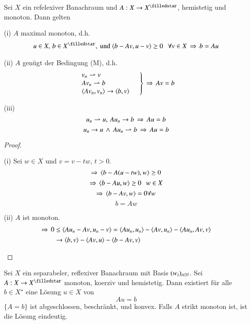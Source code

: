\begin{lem}[Minty]\label{4.5}
    Sei $X$ ein refelexiver Banachraum und $A:X\ra X^\star$, hemistetig und monoton. Dann gelten
    \begin{description}
        \item{(i)}
        $A$ maximal monoton, d.h.
        \begin{align*}
            u\in X, \, b\in X^\star, \text{ und } \lal b-Av,u-v\ral\geq 0 \qq \forall v\in X\, \Ra \,b=Au
        \end{align*}
        \item{(ii)}
        $A$ genügt der Bedingung (M), d.h.
        \begin{align}\label{15}
            \left.\begin{array}{lr}
            v_n \rightharpoonup v& \\
            Av_n\rightharpoonup b& \\
            \langle Av_n,v_n\rangle \rightarrow \langle b,v\rangle&
            \end{array}\right\}
            \,\Rightarrow \, Av=b            
        \end{align}
        \item{(iii)}
        \[
            u_n \rightharpoonup u, \, Au_n\rightarrow b \, \Rightarrow \, Au=b
        \]
        \[
            u_n\rightarrow u \,\wedge \, Au_n \rightharpoonup b \, \Rightarrow \, Au=b
        \]
    \end{description}
\end{lem}

\begin{proof}
    \begin{description}
    \item{(i)}
    Sei $w\in X$ und $v=v-tw, \, t>0$.
    \[
        \Rightarrow \,\langle b-A(u-tw),w\rangle\geq 0
    \]
    \[
        \Rightarrow\,\langle b-Au, w\rangle\geq 0 \hspace{.25cm} w\in X
    \]
    \[
        \Rightarrow \,\langle b-Av,w\rangle=0 \forall w
    \]
    \[
        b=Aw
    \]
    \item{(ii)}
    $A$ ist monoton.
    \begin{align*}
    \Rightarrow \, 0&\leq \langle Au_n-Av,u_n-v\rangle = \langle Au_n,u_n\rangle-\langle Av,u_n\rangle - \langle Au_n,Av,v\rangle\\
    &\rightarrow \langle b,v\rangle-\langle Av,u\rangle-\langle b-Av,v\rangle
    \end{align*}
    \end{description}
\end{proof}

\begin{theorem}\label{4.6}
    Sei $X$ ein separabeler, reflexiver Banachraum mit Basis $(w_i)_{i\in \mathbb{N}}$. Sei $A:X\ra X^\star$
    monoton, koerziv und hemistetig. Dann existiert für alle $b\in X^\star$ eine Lösung $u\in X$ von
    \[ Au=b \]
    $\{A=b\}$ ist abgeschlossen, beschränkt, und konvex. Falls $A$ strikt monoton ist, ist die Lösung
    eindeutig.
\end{theorem}

